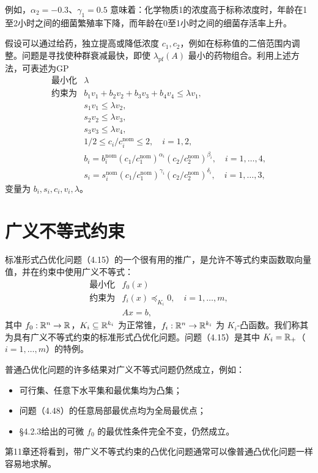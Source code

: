 例如，$\alpha_2=-0.3$、$\gamma_1=0.5$ 意味着：化学物质1的浓度高于标称浓度时，年龄在1至2小时之间的细菌繁殖率下降，而年龄在0至1小时之间的细菌存活率上升。

假设可以通过给药，独立提高或降低浓度 $c_1,c_2$，例如在标称值的二倍范围内调整。问题是寻找使种群衰减最快，即使 $\lambda_{\mathrm{pf}}(A)$ 最小的药物组合。利用上述方法，可表述为GP
\[
\begin{array}{ll}
\text{最小化}&\lambda\\
\text{约束为}&b_1v_1+b_2v_2+b_3v_3+b_4v_4\le\lambda v_1,\\
&s_1v_1\le\lambda v_2,\\&s_2v_2\le\lambda v_3,\\&s_3v_3\le\lambda v_4,\\
&1/2\le c_i/c_i^{\mathrm{nom}}\le2,\quad i=1,2,\\
&b_i=b_i^{\mathrm{nom}}(c_1/c_1^{\mathrm{nom}})^{\alpha_i}(c_2/c_2^{\mathrm{nom}})^{\beta_i},\quad i=1,\ldots,4,\\
&s_i=s_i^{\mathrm{nom}}(c_1/c_1^{\mathrm{nom}})^{\gamma_i}(c_2/c_2^{\mathrm{nom}})^{\delta_i},\quad i=1,\ldots,3,
\end{array}
\]
变量为 $b_i,s_i,c_i,v_i,\lambda$。

\section{广义不等式约束}
标准形式凸优化问题（4.15）的一个很有用的推广，是允许不等式约束函数取向量值，并在约束中使用广义不等式：
\begin{equation}
\begin{array}{ll}\text{最小化}&f_0(x)\\\text{约束为}&f_i(x)\preceq_{K_i}0,\quad i=1,\ldots,m,\\&Ax=b,\end{array}\tag{4.48}
\end{equation}
其中 $f_0:\mathbb R^n\to\mathbb R$，$K_i\subseteq\mathbb R^{k_i}$ 为正常锥，$f_i:\mathbb R^n\to\mathbb R^{k_i}$ 为 $K_i$-凸函数。我们称其为具有广义不等式约束的标准形式凸优化问题。问题（4.15）是其中 $K_i=\mathbb R_+$（$i=1,\ldots,m$）的特例。

普通凸优化问题的许多结果对广义不等式问题仍然成立，例如：
\begin{itemize}
\item 可行集、任意下水平集和最优集均为凸集；
\item 问题（4.48）的任意局部最优点均为全局最优点；
\item §4.2.3给出的可微 $f_0$ 的最优性条件完全不变，仍然成立。
\end{itemize}
第11章还将看到，带广义不等式约束的凸优化问题通常可以像普通凸优化问题一样容易地求解。


